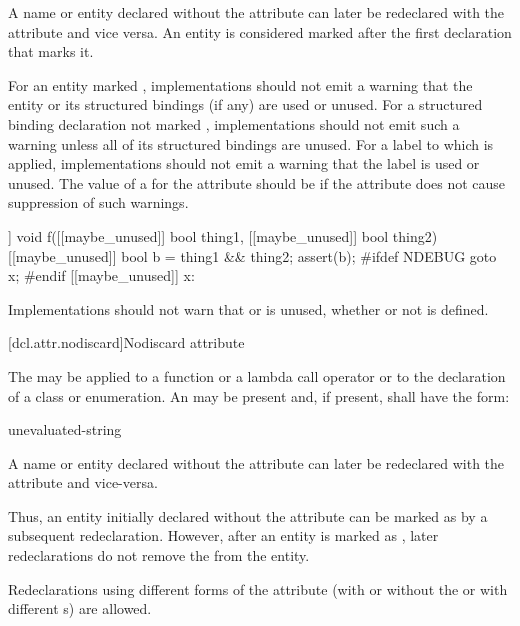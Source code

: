 \pnum
A name or entity declared without the  attribute
can later be redeclared with the attribute
and vice versa.
An entity is considered marked
after the first declaration that marks it.

\pnum
\recommended
For an entity marked ,
implementations should not emit a warning
that the entity or its structured bindings (if any)
are used or unused.
For a structured binding declaration not marked ,
implementations should not emit such a warning unless
all of its structured bindings are unused.
For a label to which  is applied,
implementations should not emit a warning that the label is used or unused.
The value of
a  for the  attribute
should be 
if the attribute does not cause suppression of such warnings.

\pnum
\begin{example}
\begin{codeblock}
[[maybe_unused]] void f([[maybe_unused]] bool thing1,
                        [[maybe_unused]] bool thing2) {
  [[maybe_unused]] bool b = thing1 && thing2;
  assert(b);
#ifdef NDEBUG
  goto x;
#endif
  [[maybe_unused]] x:
}
\end{codeblock}
Implementations should not warn that  or  is unused,
whether or not  is defined.
\end{example}

[dcl.attr.nodiscard]{Nodiscard attribute}%

\pnum
The  
may be applied to a function or a lambda call operator or
to the declaration of a class or enumeration.
An  may be present
and, if present, shall have the form:

\begin{ncbnf}
\terminal{(} unevaluated-string \terminal{)}
\end{ncbnf}

\pnum
A name or entity declared without the  attribute
can later be redeclared with the attribute and vice-versa.
\begin{note}
Thus, an entity initially declared without the attribute
can be marked as 
by a subsequent redeclaration.
However, after an entity is marked as ,
later redeclarations do not remove the 
from the entity.
\end{note}
Redeclarations using different forms of the attribute
(with or without the 
or with different s)
are allowed.

